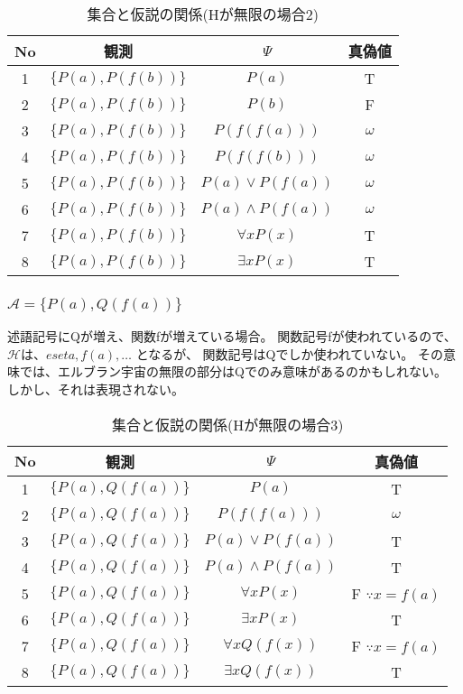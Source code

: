 \documentclass[10pt, oneside]{jarticle}   	%
\theoremstyle{definition}
\newcommand{\undet}{\omega}
\newcommand{\eset}[1]{\{{#1}\}}
\begin{document}
\begin{table}[htbp]
 \centering
 \begin{tabular}{|c|c|c|c|}\hline
   No & 観測 & $\Psi$ & 真偽値 \\ \hline
   1 & $\eset{P(a), P(f(b))}$ & $P(a)$ & T \\ \hline
   2 & $\eset{P(a), P(f(b))}$ & $P(b)$ & F \\ \hline
   3 & $\eset{P(a), P(f(b))}$ & $P(f(f(a)))$ & $\undet $\\ \hline
   4 & $\eset{P(a), P(f(b))}$ & $P(f(f(b)))$ & $\undet $\\ \hline
   5 & $\eset{P(a), P(f(b))}$ & $P(a) \lor P(f(a))$ & $\undet$ \\ \hline
   6 & $\eset{P(a), P(f(b))}$ & $P(a) \land P(f(a))$ &  $\undet$ \\ \hline
   7 & $\eset{P(a), P(f(b))}$ & $\forall x P(x)$ & T \\ \hline
   8 & $\eset{P(a), P(f(b))}$ & $\exists x P(x)$ & T \\ \hline
 \end{tabular}
 \caption{集合と仮説の関係(Hが無限の場合2)}
 \label{tab:ex0202}
\end{table}

\subsubsection{$\mathcal{A}=\eset{P(a), Q(f(a))}$}

述語記号にQが増え、関数fが増えている場合。
関数記号fが使われているので、$\mathcal{H}$は、$eset{a, f(a), \dots}$ となるが、
関数記号はQでしか使われていない。
その意味では、エルブラン宇宙の無限の部分はQでのみ意味があるのかもしれない。
しかし、それは表現されない。

\begin{table}[htbp]
 \centering
 \begin{tabular}{|c|c|c|c|}\hline
   No & 観測 & $\Psi$ & 真偽値 \\ \hline
   1 & $\eset{P(a), Q(f(a))}$ & $P(a)$ & T \\ \hline
   2 & $\eset{P(a), Q(f(a))}$ & $P(f(f(a)))$ & $\undet$ \\ \hline
   3 & $\eset{P(a), Q(f(a))}$ & $P(a) \lor P(f(a))$ & T \\ \hline
   4 & $\eset{P(a), Q(f(a))}$ & $P(a) \land P(f(a))$ & T\\ \hline
   5 & $\eset{P(a), Q(f(a))}$ & $\forall x P(x)$ & F $\because x=f(a)$ \\ \hline
   6 & $\eset{P(a), Q(f(a))}$ & $\exists x P(x)$ & T \\ \hline
   7 & $\eset{P(a), Q(f(a))}$ & $\forall x Q(f(x))$ & F $\because x=f(a)$\\ \hline
   8 & $\eset{P(a), Q(f(a))}$ & $\exists x Q(f(x))$ & T \\ \hline
 \end{tabular}
 \caption{集合と仮説の関係(Hが無限の場合3)}
 \label{tab:ex0203}
\end{table}
\end{document}

